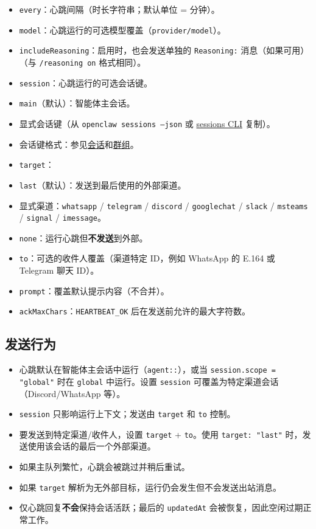 \begin{itemize}
  \item \texttt{every}：心跳间隔（时长字符串；默认单位 = 分钟）。
  \item \texttt{model}：心跳运行的可选模型覆盖（\texttt{provider/model}）。
  \item \texttt{includeReasoning}：启用时，也会发送单独的 \texttt{Reasoning:} 消息（如果可用）（与 \texttt{/reasoning on} 格式相同）。
  \item \texttt{session}：心跳运行的可选会话键。
  \item \texttt{main}（默认）：智能体主会话。
  \item 显式会话键（从 \texttt{openclaw sessions --json} 或 \href{/cli/sessions}{sessions CLI} 复制）。
  \item 会话键格式：参见\href{/concepts/session}{会话}和\href{/channels/groups}{群组}。
  \item \texttt{target}：
  \item \texttt{last}（默认）：发送到最后使用的外部渠道。
  \item 显式渠道：\texttt{whatsapp} / \texttt{telegram} / \texttt{discord} / \texttt{googlechat} / \texttt{slack} / \texttt{msteams} / \texttt{signal} / \texttt{imessage}。
  \item \texttt{none}：运行心跳但\textbf{不发送}到外部。
  \item \texttt{to}：可选的收件人覆盖（渠道特定 ID，例如 WhatsApp 的 E.164 或 Telegram 聊天 ID）。
  \item \texttt{prompt}：覆盖默认提示内容（不合并）。
  \item \texttt{ackMaxChars}：\texttt{HEARTBEAT\_OK} 后在发送前允许的最大字符数。
\end{itemize}


\subsection{发送行为}


\begin{itemize}
  \item 心跳默认在智能体主会话中运行（\texttt{agent::}），或当 \texttt{session.scope = "global"} 时在 \texttt{global} 中运行。设置 \texttt{session} 可覆盖为特定渠道会话（Discord/WhatsApp 等）。
  \item \texttt{session} 只影响运行上下文；发送由 \texttt{target} 和 \texttt{to} 控制。
  \item 要发送到特定渠道/收件人，设置 \texttt{target} + \texttt{to}。使用 \texttt{target: "last"} 时，发送使用该会话的最后一个外部渠道。
  \item 如果主队列繁忙，心跳会被跳过并稍后重试。
  \item 如果 \texttt{target} 解析为无外部目标，运行仍会发生但不会发送出站消息。
  \item 仅心跳回复\textbf{不会}保持会话活跃；最后的 \texttt{updatedAt} 会被恢复，因此空闲过期正常工作。
\end{itemize}



